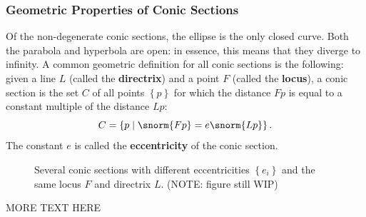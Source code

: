 \subsubsection{Geometric Properties of Conic Sections}
Of the non-degenerate conic sections, the ellipse is the only closed curve. Both the parabola and hyperbola are open: in essence, this means that they diverge to infinity. A common geometric definition for all conic sections is the following: given a line $L$ (called the \textbf{directrix}) and a point $F$ (called the \textbf{locus}), a conic section is the set $C$ of all points $\left\{p\right\}$ for which the distance $Fp$ is equal to a constant multiple of the distance $Lp$:
\begin{equation}
  C = \left\{ p \mid \snorm{Fp} = e\snorm{Lp} \right\}.
  \label{eq:conic_section_geometric_definition}
\end{equation}
The constant $e$ is called the \textbf{eccentricity} of the conic section.

\begin{figure}
  \begin{center}
  \end{center}
  \caption{Several conic sections with different eccentricities $\left\{e_{i}\right\}$ and the same locus $F$ and directrix $L$. (NOTE: figure still WIP)}
  \label{fig:conic_sections_geometrically}
\end{figure}

MORE TEXT HERE

